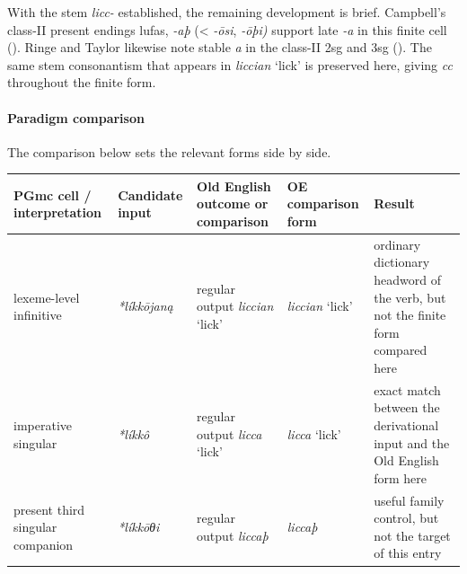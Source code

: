 \documentclass[
  british,
  a4paper,
]{article}
\newcounter{none} %
\begin{document}
With the stem \emph{licc-} established, the remaining development is
brief. Campbell's class-II present endings lufas, \emph{-aþ}
(\textless{} \emph{-ōsi}, \emph{-ōþi)} support late \emph{-a} in this
finite cell ().
Ringe and Taylor likewise note stable \emph{a} in the class-II 2sg and
3sg (). The
same stem consonantism that appears in \emph{liccian} `lick' is
preserved here, giving \emph{cc} throughout the finite form.

\paragraph{Paradigm comparison}\label{paradigm-comparison-23}

The comparison below sets the relevant forms side by side.

{\def\LTcaptype{none} %
\begin{longtable}[]{@{}
  >{\raggedright\arraybackslash}p{}
  >{\raggedright\arraybackslash}p{}
  >{\raggedright\arraybackslash}p{}
  >{\raggedright\arraybackslash}p{}
  >{\raggedright\arraybackslash}p{}@{}}
\toprule\noalign{}
\begin{minipage}[b]{\linewidth}\raggedright
PGmc cell / interpretation
\end{minipage} & \begin{minipage}[b]{\linewidth}\raggedright
Candidate input
\end{minipage} & \begin{minipage}[b]{\linewidth}\raggedright
Old English outcome or comparison
\end{minipage} & \begin{minipage}[b]{\linewidth}\raggedright
OE comparison form
\end{minipage} & \begin{minipage}[b]{\linewidth}\raggedright
Result
\end{minipage} \\
\midrule\noalign{}
\endhead
\bottomrule\noalign{}
\endlastfoot
lexeme-level infinitive & {\emph{*líkkōjaną}} & regular output
{\emph{liccian}} `lick' & {\emph{liccian}} `lick' & ordinary dictionary
headword of the verb, but not the finite form compared here \\
imperative singular & {\emph{*líkkô}} & regular output {\emph{licca}}
`lick' & {\emph{licca}} `lick' & exact match between the derivational
input and the Old English form here \\
present third singular companion & {\emph{*líkkōθi}} & regular output
{\emph{liccaþ}} & {\emph{liccaþ}} & useful family control, but not the
target of this entry \\
\end{longtable}
}
\end{document}
